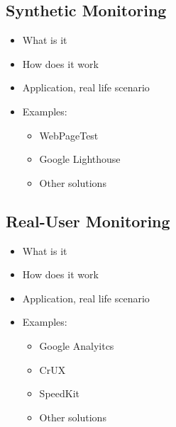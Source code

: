 






\subsection{Synthetic Monitoring}

\begin{itemize}
    \item What is it
    \item How does it work
    \item Application, real life scenario
    \item Examples:
    \begin{itemize}
        \item WebPageTest
        \item Google Lighthouse
        \item Other solutions
    \end{itemize}
\end{itemize}
















\subsection{Real-User Monitoring}

\begin{itemize}
    \item What is it
    \item How does it work
    \item Application, real life scenario
    \item Examples:
    \begin{itemize}
        \item Google Analyitcs
        \item CrUX
        \item SpeedKit
        \item Other solutions
    \end{itemize}
\end{itemize}

